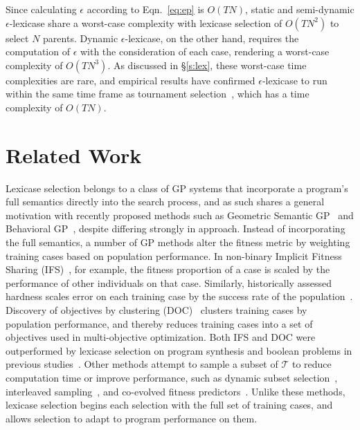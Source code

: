 \documentclass[twoside]{article}
\begin{document}
Since calculating $\epsilon$ according to Eqn.~\ref{eq:ep} is $O(TN)$, static and semi-dynamic $\epsilon$-lexicase share a worst-case complexity with lexicase selection of $O(TN^2)$ to select $N$ parents. Dynamic $\epsilon$-lexicase, on the other hand, requires the computation of $\epsilon$ with the consideration of each case, rendering a worst-case complexity of $O(TN^3)$. As discussed in \S\ref{s:lex}, these worst-case time complexities are rare, and empirical results have confirmed $\epsilon$-lexicase to run within the same time frame as tournament selection~\citep{la_cava_epsilon-lexicase_2016}, which has a time complexity of $O(TN)$. 

\section{Related Work}\label{s:rw}

Lexicase selection belongs to a class of GP systems that incorporate a program's full semantics directly into the search process, and as such shares a general motivation with recently proposed methods such as Geometric Semantic GP~\citep{moraglio_geometric_2012} and Behavioral GP~\citep{krawiec_behavioral_2014}, despite differing strongly in approach. Instead of incorporating the full semantics, a number of GP methods alter the fitness metric by weighting training cases based on population performance. In non-binary Implicit Fitness Sharing (IFS)~\citep{krawiec_implicit_2013}, for example, the fitness proportion of a case is scaled by the performance of other individuals on that case. Similarly, historically assessed hardness scales error on each training case by the success rate of the population~\citep{klein_genetic_2008}. Discovery of objectives by clustering (DOC)~\citep{krawiec_automatic_2015} clusters training cases by population performance, and thereby reduces training cases into a set of objectives used in multi-objective optimization. Both IFS and DOC were outperformed by lexicase selection on program synthesis and boolean problems in previous studies~\citep{helmuth_general_2015-1,liskowski_comparison_2015}. Other methods attempt to sample a subset of $\mathcal{T}$ to reduce computation time or improve performance, such as dynamic subset selection~\citep{gathercole_dynamic_1994}, interleaved sampling~\citep{goncalves_balancing_2013}, and co-evolved fitness predictors~\citep{schmidt_coevolution_2008}. Unlike these methods, lexicase selection begins each selection with the full set of training cases, and allows selection to adapt to program performance on them.
\end{document}
